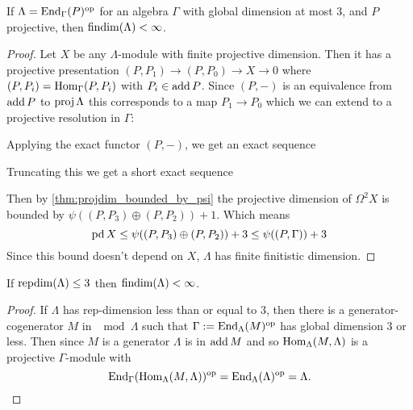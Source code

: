 \begin{theorem}\cite[Corollary~8]{IgTo05}
	If $\Lambda = \operatorname{End}_\Gamma(P)^{\operatorname{op}}$ for an algebra $\Gamma$ with global dimension at most 3, and $P$ projective, then $\operatorname{findim}(\Lambda) < \infty$.
	\begin{proof}
		Let $X$ be any $\Lambda$-module with finite projective dimension. Then it has a projective presentation $(P, P_1) \to (P,P_0) \to X \to 0$ where $(P,P_i)=\operatorname{Hom}_\Gamma(P,P_i)$ with $P_i \in \operatorname{add} P$. Since $(P,-)$ is an equivalence from $\operatorname{add} P$ to $\operatorname{proj}\Lambda$ this corresponds to a map $P_1 \to P_0$ which we can extend to a projective resolution in $\Gamma$:
		\begin{center}
		\end{center}
		Applying the exact functor $(P, -)$, we get an exact sequence
		\begin{center}
		\end{center}
		Truncating this we get a short exact sequence
		\begin{center}
		\end{center}
		Then by \cref{thm:projdim_bounded_by_psi} the projective dimension of $\Omega^2 X$ is bounded by $\psi((P, P_3)\oplus (P, P_2))+1$. Which means
		$$\operatorname{pd} X \leq \psi((P, P_3)\oplus (P, P_2))+3 \leq \psi((P,\Gamma))+3$$
		Since this bound doesn't depend on $X$, $\Lambda$ has finite finitistic dimension.
	\end{proof} 
\end{theorem}

\begin{cor}\label{cor:repdim_less_than_3_implies FDC}
	If $\operatorname{repdim}(\Lambda) \leq 3$ then $\operatorname{findim}(\Lambda) < \infty$.
	\begin{proof}
		If $\Lambda$ has rep-dimension less than or equal to 3, then there is a generator-cogenerator $M$ in $\mod\Lambda$ such that $\Gamma := \operatorname{End}_\Lambda(M)^{\operatorname{op}}$ has global dimension 3 or less. Then since $M$ is a generator $\Lambda$ is in $\operatorname{add} M$ and so $\operatorname{Hom}_\Lambda(M, \Lambda)$ is a projective $\Gamma$-module with 
		$$\operatorname{End}_\Gamma(\operatorname{Hom}_\Lambda(M, \Lambda))^{\operatorname{op}} = \operatorname{End}_\Lambda(\Lambda)^{\operatorname{op}} = \Lambda.$$
	\end{proof}
\end{cor}
